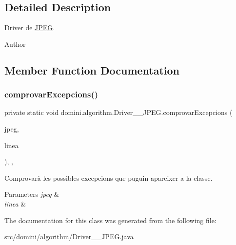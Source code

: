 \subsection{Detailed Description}
Driver de \hyperlink{classdomini_1_1algorithm_1_1JPEG}{J\+P\+EG}. 

\begin{DoxyAuthor}{Author}

\end{DoxyAuthor}


\subsection{Member Function Documentation}
\mbox{\label{classdomini_1_1algorithm_1_1Driver____JPEG_ae75883665dbbf55adaa8db46f2211c75}} 
\subsubsection{\texorpdfstring{comprovar\+Excepcions()}{comprovarExcepcions()}}
{\footnotesize\ttfamily private static void domini.\+algorithm.\+Driver\+\_\+\+\_\+\+J\+P\+E\+G.\+comprovar\+Excepcions (\begin{DoxyParamCaption}\item[{\hyperlink{classdomini_1_1algorithm_1_1JPEG}{J\+P\+EG}}]{jpeg,  }\item[{String}]{linea }\end{DoxyParamCaption})\hspace{0.3cm}{\ttfamily [inline]}, {\ttfamily [static]}, {\ttfamily [private]}}



Comprovarà les possibles excepcions que puguin apareixer a la classe. 


\begin{DoxyParams}{Parameters}
{\em jpeg} & \\
\hline
{\em linea} & \\
\hline
\end{DoxyParams}


The documentation for this class was generated from the following file\+:\begin{DoxyCompactItemize}
\item 
src/domini/algorithm/Driver\+\_\+\+\_\+\+J\+P\+E\+G.\+java\end{DoxyCompactItemize}
